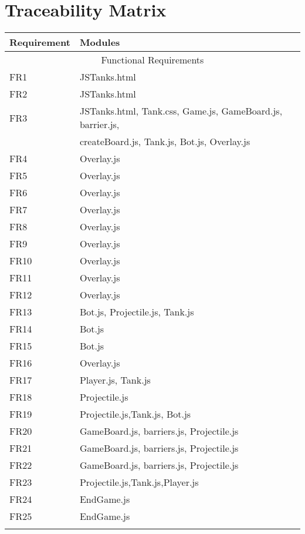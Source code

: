 \documentclass{article}
\begin{document}
\section{Traceability Matrix}
\begin{table}[!htbp]
      \begin{tabular}{ll}
        \toprule
        Requirement & Modules \\
        \midrule
        \multicolumn{2}{c}{Functional Requirements} \\
        \midrule
        FR1 & JSTanks.html \\
        FR2 & JSTanks.html \\
        FR3 & JSTanks.html, Tank.css, Game.js, GameBoard.js, barrier.js, \\
                 & createBoard.js, Tank.js, Bot.js, Overlay.js \\
        FR4 & Overlay.js \\
        FR5 & Overlay.js \\
        FR6 & Overlay.js \\
        FR7 & Overlay.js\\
        FR8 & Overlay.js \\
        FR9 & Overlay.js \\
        FR10 & Overlay.js \\
        FR11 & Overlay.js \\
        FR12 & Overlay.js \\
        FR13 & Bot.js, Projectile.js, Tank.js \\
        FR14 & Bot.js \\
        FR15 & Bot.js \\
        FR16 & Overlay.js \\
        FR17 & Player.js, Tank.js \\
        FR18 & Projectile.js \\
        FR19 & Projectile.js,Tank.js, Bot.js\\
        FR20 & GameBoard.js, barriers.js, Projectile.js\\
        FR21 & GameBoard.js, barriers.js, Projectile.js \\
        FR22 & GameBoard.js, barriers.js, Projectile.js \\
        FR23 & Projectile.js,Tank.js,Player.js  \\
        FR24 & EndGame.js \\
        FR25 & EndGame.js \\ \\

\end{tabular}
\end{table}
\end{document}
